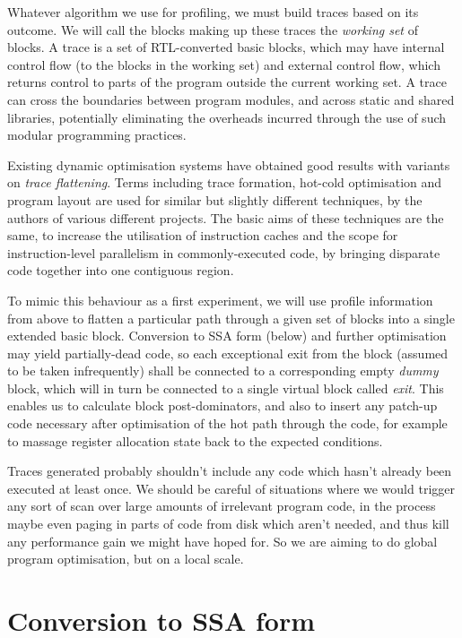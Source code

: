 Whatever algorithm we use for profiling, we must build traces based on its outcome. We will call the blocks making up these traces the \emph{working set} of blocks. A trace is a set of RTL-converted basic blocks, which may have internal control flow (to the blocks in the working set) and external control flow, which returns control to parts of the program outside the current working set. A trace can cross the boundaries between program modules, and across static and shared libraries, potentially eliminating the overheads incurred through the use of such modular programming practices.

Existing dynamic optimisation systems have obtained good results with variants on \emph{trace flattening}. Terms including trace formation, hot-cold optimisation and program layout are used for similar but slightly different techniques, by the authors of various different projects. The basic aims of these techniques are the same, to increase the utilisation of instruction caches and the scope for instruction-level parallelism in commonly-executed code, by bringing disparate code together into one contiguous region.

To mimic this behaviour as a first experiment, we will use profile information from above to flatten a particular path through a given set of blocks into a single extended basic block. Conversion to SSA form (below) and further optimisation may yield partially-dead code, so each exceptional exit from the block (assumed to be taken infrequently) shall be connected to a corresponding empty \emph{dummy} block, which will in turn be connected to a single virtual block called \emph{exit}. This enables us to calculate block post-dominators, and also to insert any patch-up code necessary after optimisation of the hot path through the code, for example to massage register allocation state back to the expected conditions.

Traces generated probably shouldn't include any code which hasn't already been executed at least once. We should be careful of situations where we would trigger any sort of scan over large amounts of irrelevant program code, in the process maybe even paging in parts of code from disk which aren't needed, and thus kill any performance gain we might have hoped for. So we are aiming to do global program optimisation, but on a local scale.

\section{Conversion to SSA form}

